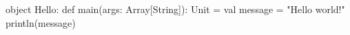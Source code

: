 \begin{Code}
object Hello:
  def main(args: Array[String]): Unit = 
    val message = "Hello world!"
    println(message)
\end{Code}


\QUESTEND












% 







% 






